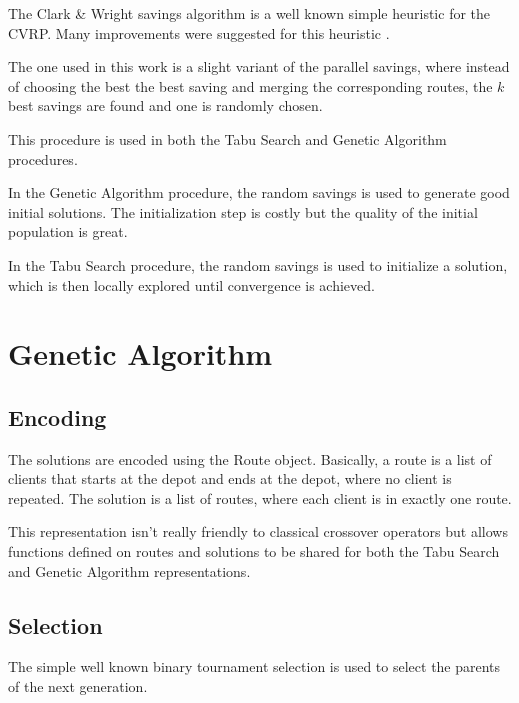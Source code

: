 \documentclass{article} %
\begin{document}
The Clark \& Wright savings algorithm is a well known simple heuristic for the CVRP.
Many improvements were suggested for this heuristic \cite{clark_wright_ds}.\newline

The one used in this work is a slight variant of the parallel savings, where instead of choosing the best the best saving and merging the corresponding routes, the $k$ best savings are found and one is randomly chosen.\newline

This procedure is used in both the Tabu Search and Genetic Algorithm procedures.\newline

In the Genetic Algorithm procedure, the random savings is used to generate good initial solutions. The initialization step is costly but the quality of the initial population is great.\newline

In the Tabu Search procedure, the random savings is used to initialize a solution, which is then locally explored until convergence is achieved.



\section{Genetic Algorithm}
\label{genetic_algorithm}

\subsection{Encoding}

The solutions are encoded using the Route object. Basically, a route is a list of clients that starts at the depot and ends at the depot, where no client is repeated. The solution is a list of routes, where each client is in exactly one route.

This representation isn't really friendly to classical crossover operators but allows functions defined on routes and solutions to be shared for both the Tabu Search and Genetic Algorithm representations.

\subsection{Selection}

The simple well known binary tournament selection is used to select the parents of the next generation.
\end{document}
